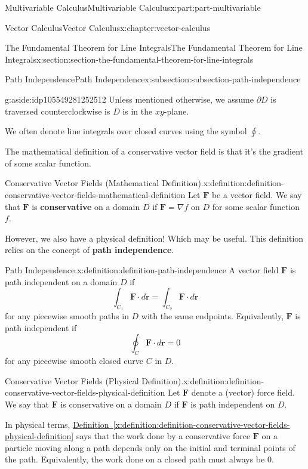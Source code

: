 \documentclass[twoside,10pt,]{book}
\newcommand{\xreffont}{\relax}
\newcommand{\terminology}[1]{\textbf{#1}}
\numberwithin{equation}{part}
\newcommand{\grad}{\nabla}
\newcommand{\vb}[1]{\mathbf{#1}}
\newcommand{\dr}{\cdot d\vb{r}}
\begin{document}
\begin{partptx}{Multivariable Calculus}{}{Multivariable Calculus}{}{}{x:part:part-multivariable}
\begin{chapterptx}{Vector Calculus}{}{Vector Calculus}{}{}{x:chapter:vector-calculus}
\begin{sectionptx}{The Fundamental Theorem for Line Integrals}{}{The Fundamental Theorem for Line Integrals}{}{}{x:section:section-the-fundamental-theorem-for-line-integrals}
\begin{subsectionptx}{Path Independence}{}{Path Independence}{}{}{x:subsection:subsection-path-independence}
\begin{aside}{}{g:aside:idp105549281252512}
Unless mentioned otherwise, we assume \(\partial D\) is traversed counterclockwise is \(D\) is in the \(xy\)-plane.%
\end{aside}
 We often denote line integrals over closed curves using the symbol \(\oint\).%
\par
The mathematical definition of a conservative vector field is that it's the gradient of some scalar function.%
\begin{definition}{Conservative Vector Fields (Mathematical Definition).}{x:definition:definition-conservative-vector-fields-mathematical-definition}%
%
Let \(\vb{F}\) be a vector field. We say that \(\vb{F}\) is \terminology{conservative} on a domain \(D\) if \(\vb{F} = \grad f\) on \(D\) for some scalar function \(f\).%
\end{definition}
However, we also have a physical definition! Which may be useful. This definition relies on the concept of \terminology{path independence}.%
\begin{definition}{Path Independence.}{x:definition:definition-path-independence}%
%
A vector field \(\vb{F}\) is path independent on a domain \(D\) if%
\begin{equation*}
\int_{C_{1}}\vb{F}\dr = \int_{C_{2}}\vb{F}\cdot d\vb{r}
\end{equation*}
for any piecewise smooth paths in \(D\) with the same endpoints. Equivalently, \(\vb{F}\) is path independent if%
\begin{equation*}
\oint_{C}\vb{F}\cdot d\vb{r} = 0
\end{equation*}
for any piecewise smooth closed curve \(C\) in \(D\).%
\end{definition}
\begin{definition}{Conservative Vector Fields (Physical Definition).}{x:definition:definition-conservative-vector-fields-physical-definition}%
Let \(\vb{F}\) denote a (vector) force field. We say that \(\vb{F}\) is conservative on a domain \(D\) if \(\vb{F}\) is path independent on \(D\).%
\end{definition}
In physical terms, \hyperref[x:definition:definition-conservative-vector-fields-physical-definition]{Definition~{\xreffont\ref{x:definition:definition-conservative-vector-fields-physical-definition}}} says that the work done by a conservative force \(\vb{F}\) on a particle moving along a path depends only on the initial and terminal points of the path. Equivalently, the work done on a closed path must always be \(0\).%

\end{subsectionptx}
\end{sectionptx}
\end{chapterptx}
\end{partptx}
\end{document}
